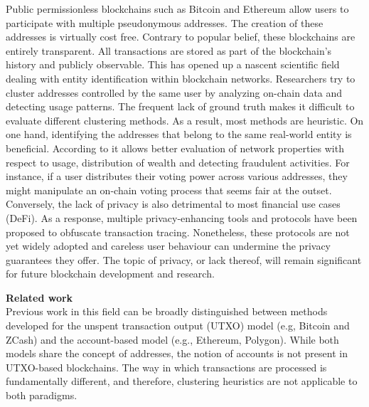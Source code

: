 \documentclass[12pt,a4paper,titlepage,oneside,english]{article}
\begin{document}
Public permissionless blockchains such as Bitcoin \citep{nakamotoBitcoin2008} and Ethereum \citep{buterin2014ethereum} allow users %
 to participate with multiple pseudonymous addresses. The creation of these addresses is virtually cost free. Contrary to popular belief, these blockchains are entirely transparent. All transactions are stored as part of the blockchain's history and publicly observable.
This has opened up a nascent scientific field dealing with entity identification within blockchain networks. Researchers try to cluster addresses controlled by the same user by analyzing on-chain data and detecting usage patterns. The frequent lack of ground truth makes it difficult to evaluate different clustering methods. As a result, most methods are heuristic. %
\newline On one hand, identifying the addresses that belong to the same real-world entity is beneficial. According to \cite{FV:17} it allows better evaluation of network properties with respect to usage, distribution of wealth and detecting fraudulent activities. For instance, if a user distributes their voting power across various addresses, they might manipulate an on-chain voting process that seems fair at the outset. \newline
Conversely, the lack of privacy is also detrimental to most financial use cases (DeFi). As a response, multiple privacy-enhancing tools and protocols have been proposed to obfuscate transaction tracing. 
Nonetheless, these protocols are not yet widely adopted and careless user behaviour can undermine the privacy guarantees they offer. \newline
The topic of privacy, or lack thereof, will remain significant for future blockchain development and research.


\textbf{Related work}\\
Previous work in this field can be broadly distinguished between methods%
 developed for the unspent transaction output (UTXO) model (e.g, Bitcoin and ZCash) and the account-based model (e.g., Ethereum, Polygon). While both models share the concept of addresses, the notion of accounts is not present in UTXO-based blockchains. The way in which transactions are processed is fundamentally different, and therefore, clustering heuristics are not applicable to both paradigms.
\end{document}
